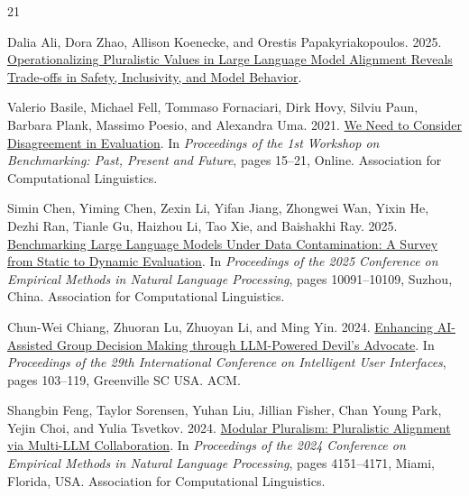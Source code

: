 \documentclass[11pt,a4paper]{article}
\begin{document}
\begin{thebibliography}{21}

Dalia Ali, Dora Zhao, Allison Koenecke, and Orestis Papakyriakopoulos. 2025. \href{https://doi.org/10.48550/ARXIV.2511.14476}{Operationalizing Pluralistic Values in Large Language Model Alignment Reveals Trade-offs in Safety, Inclusivity, and Model Behavior}.

Valerio Basile, Michael Fell, Tommaso Fornaciari, Dirk Hovy, Silviu Paun, Barbara Plank, Massimo Poesio, and Alexandra Uma. 2021. \href{https://doi.org/10.18653/v1/2021.bppf-1.3}{We Need to Consider Disagreement in Evaluation}. In \emph{Proceedings of the 1st Workshop on Benchmarking: Past, Present and Future}, pages 15--21, Online. Association for Computational Linguistics.

Simin Chen, Yiming Chen, Zexin Li, Yifan Jiang, Zhongwei Wan, Yixin He, Dezhi Ran, Tianle Gu, Haizhou Li, Tao Xie, and Baishakhi Ray. 2025. \href{https://doi.org/10.18653/v1/2025.emnlp-main.511}{Benchmarking Large Language Models Under Data Contamination: A Survey from Static to Dynamic Evaluation}. In \emph{Proceedings of the 2025 Conference on Empirical Methods in Natural Language Processing}, pages 10091--10109, Suzhou, China. Association for Computational Linguistics.

Chun-Wei Chiang, Zhuoran Lu, Zhuoyan Li, and Ming Yin. 2024. \href{https://doi.org/10.1145/3640543.3645199}{Enhancing AI-Assisted Group Decision Making through LLM-Powered Devil's Advocate}. In \emph{Proceedings of the 29th International Conference on Intelligent User Interfaces}, pages 103--119, Greenville SC USA. ACM.

Shangbin Feng, Taylor Sorensen, Yuhan Liu, Jillian Fisher, Chan Young Park, Yejin Choi, and Yulia Tsvetkov. 2024. \href{https://doi.org/10.18653/v1/2024.emnlp-main.240}{Modular Pluralism: Pluralistic Alignment via Multi-LLM Collaboration}. In \emph{Proceedings of the 2024 Conference on Empirical Methods in Natural Language Processing}, pages 4151--4171, Miami, Florida, USA. Association for Computational Linguistics.


\end{thebibliography}
\end{document}
